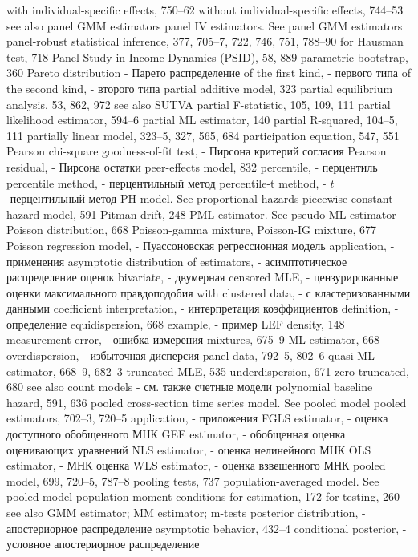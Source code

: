 with individual-specific effects, 750–62 without individual-specific effects, 744–53 see also panel GMM estimators
panel IV estimators. See panel GMM estimators panel-robust statistical inference, 377, 705–7, 722,
746, 751, 788–90 for Hausman test, 718
Panel Study in Income Dynamics (PSID), 58, 889 parametric bootstrap, 360
Pareto distribution - Парето распределение
of the first kind, - первого типа
of the second kind, - второго типа
partial additive model, 323
partial equilibrium analysis, 53, 862, 972
see also SUTVA
partial F-statistic, 105, 109, 111
partial likelihood estimator, 594–6
partial ML estimator, 140
partial R-squared, 104–5, 111
partially linear model, 323–5, 327, 565, 684 participation equation, 547, 551
Pearson chi-square goodness-of-fit test, - Пирсона критерий согласия
Pearson residual, - Пирсона остатки
peer-effects model, 832
percentile, - перцентиль 
percentile method, - перцентильный метод
percentile-t method, - $t$-перцентильный метод
PH model. See proportional hazards piecewise constant hazard model, 591 Pitman drift, 248
PML estimator. See pseudo-ML estimator Poisson distribution, 668
Poisson-gamma mixture, 
Poisson-IG mixture, 677
Poisson regression model, - Пуассоновская регрессионная модель
application, - применения
asymptotic distribution of estimators, - асимптотическое распределение оценок
bivariate, - двумерная
censored MLE, - цензурированные оценки максимального правдоподобия
with clustered data, - с кластеризованными данными
coefficient interpretation, - интерпретация коэффициентов
definition, - определение
equidispersion, 668
example, - пример
LEF density, 148 
measurement error, - ошибка измерения
mixtures, 675–9
ML estimator, 668
overdispersion, - избыточная дисперсия
panel data, 792–5, 802–6 quasi-ML estimator, 668–9, 682–3 truncated MLE, 535 underdispersion, 671 zero-truncated, 680
see also count models - см. также счетные модели
polynomial baseline hazard, 591, 636
pooled cross-section time series model. See pooled
model
pooled estimators, 702–3, 720–5 
application, - приложения
FGLS estimator, - оценка доступного обобщенного МНК
GEE estimator, - обобщенная оценка оценивающих уравнений
NLS estimator, - оценка нелинейного МНК
OLS estimator, - МНК оценка
WLS estimator, - оценка взвешенного МНК
pooled model, 699, 720–5, 787–8
pooling tests, 737
population-averaged model. See pooled model population moment conditions
for estimation, 172
for testing, 260
see also GMM estimator; MM estimator; m-tests
posterior distribution, - апостериорное распределение
asymptotic behavior, 432–4 
conditional posterior, - условное апостериорное распределение
